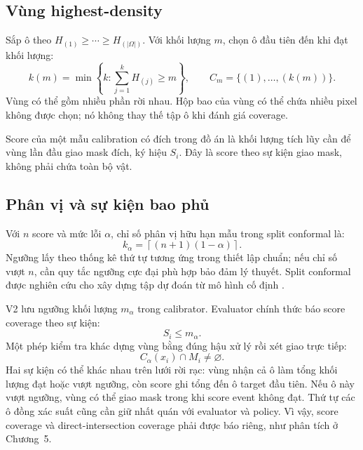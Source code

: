 \subsection{Vùng highest-density}

Sắp ô theo $H_{(1)}\geq\cdots\geq H_{(|\Omega|)}$. Với khối lượng $m$, chọn ô đầu tiên đến khi đạt khối lượng:
\begin{equation}
    k(m)=\min\left\{k:\sum_{j=1}^{k}H_{(j)}\geq m\right\},
    \qquad C_m=\{(1),\ldots,(k(m))\}.
    \label{eq:theory-hd-region}
\end{equation}
Vùng có thể gồm nhiều phần rời nhau. Hộp bao của vùng có thể chứa nhiều pixel không được chọn; nó không thay thế tập ô khi đánh giá coverage.

Score của một mẫu calibration có đích trong đồ án là khối lượng tích lũy cần để vùng lần đầu giao mask đích, ký hiệu $S_i$. Đây là score theo sự kiện giao mask, không phải chứa toàn bộ vật.

\subsection{Phân vị và sự kiện bao phủ}

Với $n$ score và mức lỗi $\alpha$, chỉ số phân vị hữu hạn mẫu trong split conformal là:
\begin{equation}
    k_\alpha=\left\lceil(n+1)(1-\alpha)\right\rceil.
    \label{eq:theory-conformal-quantile}
\end{equation}
Ngưỡng lấy theo thống kê thứ tự tương ứng trong thiết lập chuẩn; nếu chỉ số vượt $n$, cần quy tắc ngưỡng cực đại phù hợp bảo đảm lý thuyết. Split conformal được nghiên cứu cho xây dựng tập dự đoán từ mô hình cố định \cite{lei2018distributionfree}.

V2 lưu ngưỡng khối lượng $m_\alpha$ trong calibrator. Evaluator chính thức báo score coverage theo sự kiện:
\begin{equation}
    S_i\leq m_\alpha.
    \label{eq:theory-region-score-event}
\end{equation}
Một phép kiểm tra khác dựng vùng bằng đúng hậu xử lý rồi xét giao trực tiếp:
\begin{equation}
    C_\alpha(x_i)\cap M_i\neq\varnothing.
    \label{eq:theory-region-intersection}
\end{equation}
Hai sự kiện có thể khác nhau trên lưới rời rạc: vùng nhận cả ô làm tổng khối lượng đạt hoặc vượt ngưỡng, còn score ghi tổng đến ô target đầu tiên. Nếu ô này vượt ngưỡng, vùng có thể giao mask trong khi score event không đạt. Thứ tự các ô đồng xác suất cũng cần giữ nhất quán với evaluator và policy. Vì vậy, score coverage và direct-intersection coverage phải được báo riêng, như phân tích ở Chương~5.

